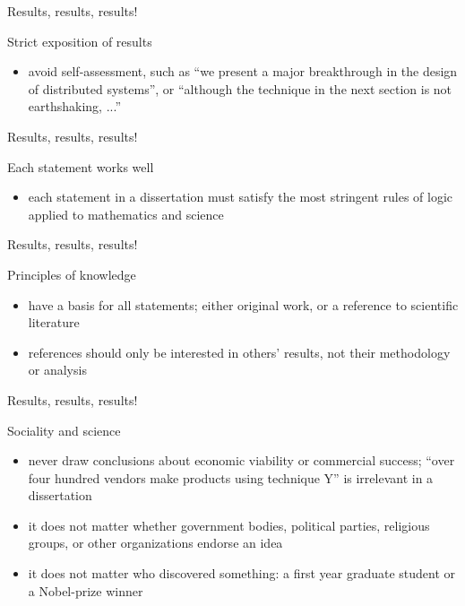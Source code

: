\documentclass{beamer}
\begin{document}
\begin{frame}{Results, results, results!}
\begin{block}{Strict exposition of results}
\begin{itemize}
\item avoid self-assessment, such as ``we present a major breakthrough in the design of distributed systems'', or ``although the technique in the next section is not earthshaking, ...''
\end{itemize}
\end{block}
\end{frame}


\begin{frame}{Results, results, results!}
\begin{block}{Each statement works well}
\begin{itemize}
\item each statement in a dissertation must satisfy the most stringent rules of logic applied to mathematics and science
\end{itemize}
\end{block}
\end{frame}


\begin{frame}{Results, results, results!}
\begin{block}{Principles of knowledge}
\begin{itemize}
\item have a basis for all statements; either original work, or a reference to scientific literature
\item references should only be interested in others' results, not their methodology or analysis
\end{itemize}
\end{block}
\end{frame}


\begin{frame}{Results, results, results!}
\begin{block}{Sociality and science}
\begin{itemize}
\item never draw conclusions about economic viability or commercial success; ``over four hundred vendors make products using technique Y'' is irrelevant in a dissertation
\item it does not matter whether government bodies, political parties, religious groups, or other organizations endorse an idea
\item it does not matter who discovered something: a first year graduate student or a Nobel-prize winner
\end{itemize}
\end{block}
\end{frame}
\end{document}
